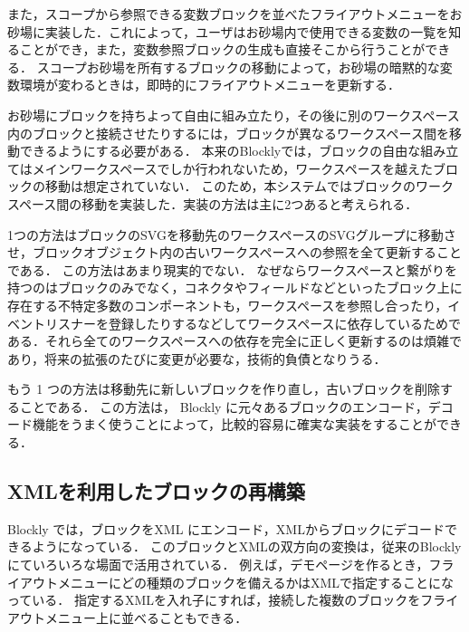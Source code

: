 また，スコープから参照できる変数ブロックを並べたフライアウトメニューをお砂場に実装した．これによって，ユーザはお砂場内で使用できる変数の一覧を知ることができ，また，変数参照ブロックの生成も直接そこから行うことができる．
スコープお砂場を所有するブロックの移動によって，お砂場の暗黙的な変数環境が変わるときは，即時的にフライアウトメニューを更新する．

お砂場にブロックを持ちよって自由に組み立たり，その後に別のワークスペース内のブロックと接続させたりするには，ブロックが異なるワークスペース間を移動できるようにする必要がある．
本来のBlocklyでは，ブロックの自由な組み立てはメインワークスペースでしか行われないため，ワークスペースを越えたブロックの移動は想定されていない．
このため，本システムではブロックのワークスペース間の移動を実装した．実装の方法は主に2つあると考えられる．

1つの方法はブロックのSVGを移動先のワークスペースのSVGグループに移動させ，ブロックオブジェクト内の古いワークスペースへの参照を全て更新することである．%
この方法はあまり現実的でない．
なぜならワークスペースと繋がりを持つのはブロックのみでなく，コネクタやフィールドなどといったブロック上に存在する不特定多数のコンポーネントも，ワークスペースを参照し合ったり，イベントリスナーを登録したりするなどしてワークスペースに依存しているためである．それら全てのワークスペースへの依存を完全に正しく更新するのは煩雑であり，将来の拡張のたびに変更が必要な，技術的負債となりうる．

もう 1 つの方法は移動先に新しいブロックを作り直し，古いブロックを削除することである．
この方法は， Blockly に元々あるブロックのエンコード，デコード機能をうまく使うことによって，比較的容易に確実な実装をすることができる．

\subsection*{XMLを利用したブロックの再構築}

Blockly では，ブロックをXML にエンコード，XMLからブロックにデコードできるようになっている．
このブロックとXMLの双方向の変換は，従来のBlocklyにていろいろな場面で活用されている．
例えば，デモページを作るとき，フライアウトメニューにどの種類のブロックを備えるかはXMLで指定することになっている．
指定するXMLを入れ子にすれば，接続した複数のブロックをフライアウトメニュー上に並べることもできる．

